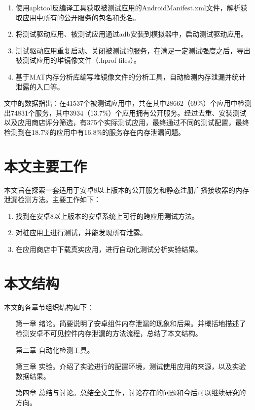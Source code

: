 \begin{enumerate}
	\item 使用apktool反编译工具\cite{apktool}获取被测试应用的AndroidManifest.xml文件，解析获取应用中所有的公开服务的包名和类名。
	\item 将测试驱动应用、被测试应用通过adb安装到模拟器中，启动测试驱动应用。
	\item 测试驱动应用重复启动、关闭被测试的服务，在满足一定测试强度之后，导出被测试应用的堆镜像文件（.hprof files）。
	\item 基于MAT内存分析库\cite{mat}编写堆镜像文件的分析工具，自动检测内存泄漏并统计泄露的入口等。
\end{enumerate}


文中的数据指出：在41537个被测试应用中，共在其中28662（69\%）个应用中检测出74831个服务，其中3934（13.7\%）个应用拥有公开服务。经过去重、安装测试以及应用商店评分筛选，有375个实际测试应用，最终通过不同的测试配置，最终检测到在18.7\%的应用中有16.8\%的服务存在内存泄漏问题。


\section{本文主要工作}
本文旨在探索一套适用于安卓8以上版本的公开服务和静态注册广播接收器的内存泄漏检测方法。主要工作如下：
\begin{enumerate}
\item 找到在安卓8以上版本的安卓系统上可行的跨应用测试方法。

\item 对桩应用上进行测试，并能发现所有泄露。

\item 在应用商店中下载真实应用，进行自动化测试分析实验结果。

\end{enumerate}
\section{本文结构}
本文的各章节组织结构如下：
\begin{itemize}
	\item[第一章] 绪论。简要说明了安卓组件内存泄漏的现象和后果。并概括地描述了检测安卓不可见控件内存泄漏的方法流程，总结了本文结构。
	\item[第二章] 自动化检测工具。
	\item[第三章] 实验。介绍了实验进行的配置环境，测试使用应用的来源，以及实验数据结果。
	\item[第四章] 总结与讨论。总结全文工作，讨论存在的问题和今后可以继续研究的方向。
\end{itemize}